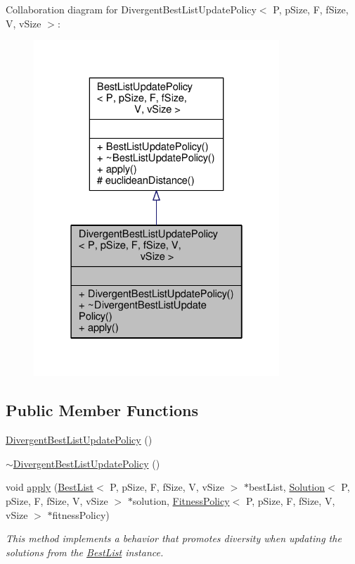 Collaboration diagram for Divergent\+Best\+List\+Update\+Policy$<$ P, p\+Size, F, f\+Size, V, v\+Size $>$\+:
\nopagebreak
\begin{figure}[H]
\begin{center}
\leavevmode
\includegraphics[width=262pt]{classDivergentBestListUpdatePolicy__coll__graph}
\end{center}
\end{figure}
\subsection*{Public Member Functions}
\begin{DoxyCompactItemize}
\item 
\hyperlink{classDivergentBestListUpdatePolicy_a9f071374e5db075f1ce1e6cba1bfa1a1}{Divergent\+Best\+List\+Update\+Policy} ()
\item 
\hyperlink{classDivergentBestListUpdatePolicy_a8c0f47b6ca1693a298c170f73d1f2d21}{$\sim$\+Divergent\+Best\+List\+Update\+Policy} ()
\item 
void \hyperlink{classDivergentBestListUpdatePolicy_a793d47a0c458eef94b27fbee73e5df0e}{apply} (\hyperlink{classBestList}{Best\+List}$<$ P, p\+Size, F, f\+Size, V, v\+Size $>$ $\ast$best\+List, \hyperlink{classSolution}{Solution}$<$ P, p\+Size, F, f\+Size, V, v\+Size $>$ $\ast$solution, \hyperlink{classFitnessPolicy}{Fitness\+Policy}$<$ P, p\+Size, F, f\+Size, V, v\+Size $>$ $\ast$fitness\+Policy)
\begin{DoxyCompactList}\small\item\em This method implements a behavior that promotes diversity when updating the solutions from the \hyperlink{classBestList}{Best\+List} instance. \end{DoxyCompactList}\end{DoxyCompactItemize}

